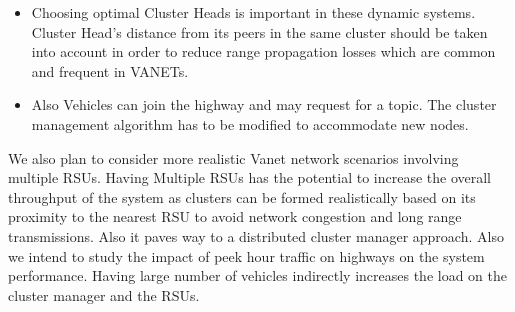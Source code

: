 \documentclass{acm_proc_article-sp}
\begin{document}
\begin{itemize}
\item Choosing optimal Cluster Heads is important in these dynamic systems. Cluster Head's distance from its peers in the same cluster should be taken into account in order to reduce range propagation losses which are common and frequent in VANETs.

\item Also Vehicles can join the highway and may request for a topic. The cluster management algorithm has to be modified to accommodate new nodes.

\end{itemize}

We also plan to consider more realistic Vanet network scenarios involving multiple RSUs. Having Multiple RSUs has the potential to increase the overall throughput of the system as clusters can be formed realistically based on its proximity to the nearest RSU to avoid network congestion and long range transmissions. Also it paves way to a distributed cluster manager approach. Also we intend to study the impact of peek hour traffic on highways on the system performance. Having large number of vehicles indirectly increases the load on the cluster manager and the RSUs.
\end{document}
